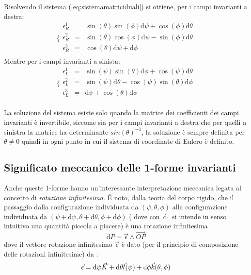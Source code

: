 \documentclass[11pt]{report}
\theoremstyle{plain}
\theoremstyle{definition}
\theoremstyle{remark}
\begin{document}
Risolvendo il sistema (\ref{eq:sistemamatriciduali}) si ottiene, per i campi invarianti a destra:
\begin{equation}\label{eq:formeinvariantisinistracomponenti}
\lbrace \begin{array}{rcl}
\epsilon_{R}^{1} & = & \sin(\theta) \sin(\phi) \textrm{d}\psi + \cos(\phi)\textrm{d}\theta \\
\epsilon_{R}^{2} & = & \sin(\theta)\cos(\phi)\textrm{d}\psi - \sin(\phi)\textrm{d}\theta \\
\epsilon_{R}^{3} & = & \cos(\theta)\textrm{d}\psi + \textrm{d}\phi \\
\end{array}
\end{equation} 
Mentre per i campi invarianti a sinista:
\begin{equation}\label{eq:formeinvariantidestracomponenti}
\lbrace \begin{array}{rcl}
\epsilon_{L}^{1} & = & \sin(\psi)\sin(\theta)\textrm{d}\phi + \cos(\psi)\textrm{d}\theta  \\
\epsilon_{L}^{2} & = & \sin(\psi)\textrm{d} \theta - \cos(\psi)\sin(\theta)\textrm{d}\phi \\
\epsilon_{L}^{3} & = & \textrm{d}\psi + \cos(\theta)\textrm{d}\phi \\
\end{array}
\end{equation}

La soluzione del sistema esiste solo quando la matrice dei coefficienti dei campi invarianti è invertibile, siccome sia per i campi invarianti a destra che per quelli a sinistra la matrice ha determinante $ sin(\theta)^{-1}$, la soluzione è sempre definita per $ \theta\neq 0$ quindi in ogni punto in cui il sistema di coordinate di Eulero è definito.

\subsection{Significato meccanico delle 1-forme invarianti}
Anche queste 1-forme hanno un'interessante interpretazione meccanica legata al concetto di \emph{rotazione infinitesima}.
É noto, dalla teoria del corpo rigido, che il passaggio dalla configurazione individuata da $(\psi, \theta , \phi)$ alla configurazione individuata da $(\psi + \textrm{d}\psi, \theta + \textrm{d}\theta , \phi + \textrm{d}\phi )$ ( dove con $\textrm{d}\cdot$ si intende in senso intuitivo una quantità piccola a piacere) è una rotazione infinitesima
\begin{displaymath}
\textrm{d} P = \vec{\epsilon} \wedge \vec{OP}
\end{displaymath}
dove il vettore rotazione infinitesimo $\vec{\epsilon}$ è dato (per il principio di composizione delle rotazioni infinitesime) da :
\begin{displaymath}
\vec{\epsilon} = \textrm{d}\psi \vec{K} + \textrm{d}\theta \vec{l}\small(\psi)+ \textrm{d}\phi \vec{k}(\small\theta,\phi)
\end{displaymath}
\end{document}
